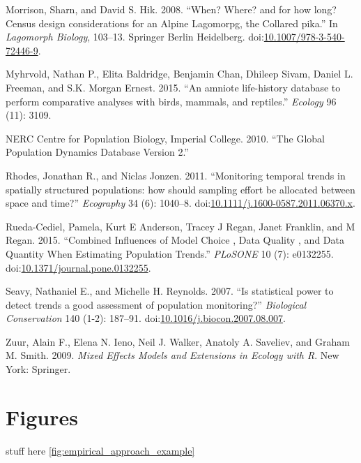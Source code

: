 \documentclass[12pt,]{article}
\begin{document}
\hypertarget{ref-Morrison2008}{}
Morrison, Sharn, and David S. Hik. 2008. ``When? Where? and for how
long? Census design considerations for an Alpine Lagomorpg, the Collared
pika.'' In \emph{Lagomorph Biology}, 103--13. Springer Berlin
Heidelberg.
doi:\href{https://doi.org/10.1007/978-3-540-72446-9}{10.1007/978-3-540-72446-9}.

\hypertarget{ref-Myhrvold2015}{}
Myhrvold, Nathan P., Elita Baldridge, Benjamin Chan, Dhileep Sivam,
Daniel L. Freeman, and S.K. Morgan Ernest. 2015. ``An amniote
life-history database to perform comparative analyses with birds,
mammals, and reptiles.'' \emph{Ecology} 96 (11): 3109.

\hypertarget{ref-GPDD2010}{}
NERC Centre for Population Biology, Imperial College. 2010. ``The Global
Population Dynamics Database Version 2.''

\hypertarget{ref-Rhodes2011}{}
Rhodes, Jonathan R., and Niclas Jonzen. 2011. ``Monitoring temporal
trends in spatially structured populations: how should sampling effort
be allocated between space and time?'' \emph{Ecography} 34 (6): 1040--8.
doi:\href{https://doi.org/10.1111/j.1600-0587.2011.06370.x}{10.1111/j.1600-0587.2011.06370.x}.

\hypertarget{ref-Rueda-Cediel2015}{}
Rueda-Cediel, Pamela, Kurt E Anderson, Tracey J Regan, Janet Franklin,
and M Regan. 2015. ``Combined Influences of Model Choice , Data Quality
, and Data Quantity When Estimating Population Trends.'' \emph{PLoSONE}
10 (7): e0132255.
doi:\href{https://doi.org/10.1371/journal.pone.0132255}{10.1371/journal.pone.0132255}.

\hypertarget{ref-Seavy2007}{}
Seavy, Nathaniel E., and Michelle H. Reynolds. 2007. ``Is statistical
power to detect trends a good assessment of population monitoring?''
\emph{Biological Conservation} 140 (1-2): 187--91.
doi:\href{https://doi.org/10.1016/j.biocon.2007.08.007}{10.1016/j.biocon.2007.08.007}.

\hypertarget{ref-Zuur2009}{}
Zuur, Alain F., Elena N. Ieno, Neil J. Walker, Anatoly A. Saveliev, and
Graham M. Smith. 2009. \emph{Mixed Effects Models and Extensions in
Ecology with R}. New York: Springer.

\section{Figures}\label{figures}

stuff here \ref{fig:empirical_approach_example}

\clearpage
\end{document}
